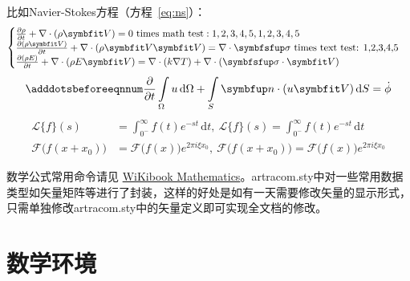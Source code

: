 比如Navier-Stokes方程（方程~\eqref{eq:ns}）：
\begin{equation} \label{eq:ns}
    \begin{cases}
        \frac{\partial \rho}{\partial t} + \nabla\cdot(\rho\Vector{V}) = 0 \ \mathrm{times\ math\ test: 1,2,3,4,5}, 1,2,3,4,5\\
        \frac{\partial (\rho\Vector{V})}{\partial t} + \nabla\cdot(\rho\Vector{V}\Vector{V}) = \nabla\cdot\Tensor{\sigma} \ \text{times text test: 1,2,3,4,5}\\
        \frac{\partial (\rho E)}{\partial t} + \nabla\cdot(\rho E\Vector{V}) = \nabla\cdot(k\nabla T) + \nabla\cdot(\Tensor{\sigma}\cdot\Vector{V})
    \end{cases}
\end{equation}
\begin{equation}
    \adddotsbeforeeqnnum%
    \frac{\partial }{\partial t}\int\limits_{\Omega} u \, \mathrm{d}\Omega + \int\limits_{S} \unitVector{n}\cdot(u\Vector{V}) \, \mathrm{d}S = \dot{\phi}
\end{equation}
\[
    \begin{split}
        \mathcal{L} \{f\}(s) &= \int _{0^{-}}^{\infty} f(t) e^{-st} \, \mathrm{d}t, \ 
        \mathscr{L} \{f\}(s) = \int _{0^{-}}^{\infty} f(t) e^{-st} \, \mathrm{d}t\\
        \mathcal{F} {\bigl (} f(x+x_{0}) {\bigr )} &= \mathcal{F} {\bigl (} f(x) {\bigr )} e^{2\pi i\xi x_{0}}, \ 
        \mathscr{F} {\bigl (} f(x+x_{0}) {\bigr )} = \mathscr{F} {\bigl (} f(x) {\bigr )} e^{2\pi i\xi x_{0}}
    \end{split}
\]

数学公式常用命令请见 \href{https://en.wikibooks.org/wiki/LaTeX/Mathematics}{WiKibook Mathematics}。artracom.sty中对一些常用数据类型如矢量矩阵等进行了封装，这样的好处是如有一天需要修改矢量的显示形式，只需单独修改artracom.sty中的矢量定义即可实现全文档的修改。

\section{数学环境}

